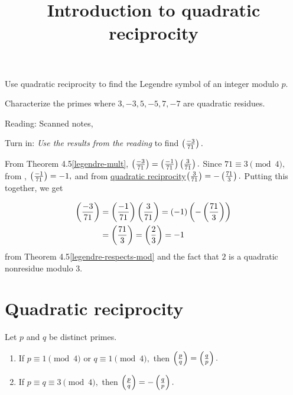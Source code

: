 \documentclass{ximera}
\title{Introduction to quadratic reciprocity}
\begin{document}
\begin{abstract}
\end{abstract}
\maketitle


\begin{obj}
    \item Use quadratic reciprocity to find the Legendre symbol of an integer modulo $p$.
    \item Characterize the primes where $3,-3,5,-5,7,-7$ are quadratic residues.
\end{obj}


\begin{pre}
    \item[Reading:] Scanned notes, \cite[Pommersheim-Marks-Flapan Section 11.2 and part of 11.3]{theo}
    \item[Turn in:] \emph{Use the results from the reading} to find $\left(\frac{-3}{71}\right).$

     \begin{solution}
     	From Theorem 4.5\ref{legendre-mult}, $\left(\frac{-3}{71}\right)=\left(\frac{-1}{71}\right)\left(\frac{3}{71}\right).$
     	Since $71\equiv3\pmod{4},$ from , $\left(\frac{-1}{71}\right)=-1,$
	and from \hyperref[quad-rec-useful-form]{quadratic reciprocity}$\left(\frac{3}{71}\right)=-\left(\frac{71}{3}\right).$ Putting this together, we get
	
		\begin{align*}
		 	\left(\frac{-3}{71}\right)&=\left(\frac{-1}{71}\right)\left(\frac{3}{71}\right)=(-1)\left(-\left(\frac{71}{3}\right)\right)\\
				&=\left(\frac{71}{3}\right)=\left(\frac{2}{3}\right)=-1
		\end{align*}
	from Theorem 4.5\ref{legendre-respects-mod} and the fact that $2$ is a quadratic nonresidue modulo $3.$
     \end{solution}
\end{pre}


\section{Quadratic reciprocity}

\begin{theorem}\label{quad-rec-useful-form}
	Let $p$ and $q$ be distinct primes.  
	\begin{enumerate}[label=(\alph*)]
		\item If $p\equiv 1 \pmod{4}$ or $q\equiv 1\pmod{4},$ then $\left(\frac{p}{q}\right)=\left(\frac{q}{p}\right).$
 		\item If $p\equiv q \equiv 3 \pmod{4},$ then $\left(\frac{p}{q}\right)=-\left(\frac{q}{p}\right).$
	\end{enumerate}
\end{theorem}
\end{document}
